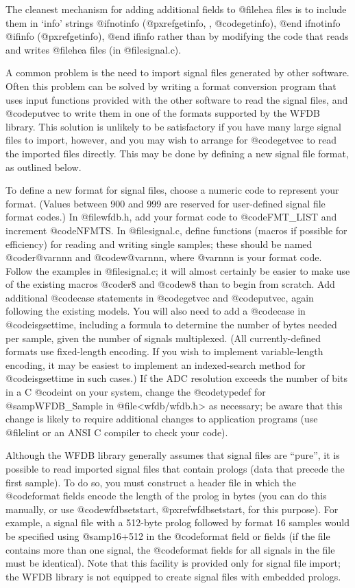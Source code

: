 {{{{{{{{The cleanest mechanism for adding additional fields to @file{hea} files is
to include them in `info' strings
@ifnotinfo
(@pxref{getinfo, , @code{getinfo}}),
@end ifnotinfo
@ifinfo
(@pxref{getinfo}),
@end ifinfo
rather than by modifying the code that reads and writes @file{hea}
files (in @file{signal.c}).

A common problem is the need to import signal files generated by other
software.  Often this problem can be solved by writing a format
conversion program that uses input functions provided with the other
software to read the signal files, and @code{putvec} to write them
in one of the formats supported by the WFDB library.  This solution is
unlikely to be satisfactory if you have many large signal files to
import, however, and you may wish to arrange for @code{getvec} to read
the imported files directly.  This may be done by defining a new signal
file format, as outlined below.

To define a new format for signal files, choose a numeric code to
represent your format.  (Values between 900 and 999 are reserved for
user-defined signal file format codes.)  In @file{wfdb.h}, add your format
code to @code{FMT_LIST} and increment @code{NFMTS}.  In @file{signal.c},
define functions (macros if possible for efficiency) for reading and
writing single samples; these should be named @code{r@var{nnn}} and
@code{w@var{nnn}}, where @var{nnn} is your format code.  Follow the
examples in @file{signal.c}; it will almost certainly be easier to make
use of the existing macros @code{r8} and @code{w8} than to begin from
scratch.  Add additional @code{case} statements in @code{getvec} and
@code{putvec}, again following the existing models.  You will also need
to add a @code{case} in @code{isgsettime}, including a formula to
determine the number of bytes needed per sample, given the number of
signals multiplexed.  (All currently-defined formats use fixed-length
encoding.  If you wish to implement variable-length encoding, it may be
easiest to implement an indexed-search method for @code{isgsettime} in
such cases.)  If the ADC resolution exceeds the number of bits in a C
@code{int} on your system, change the @code{typedef} for @samp{WFDB_Sample}
in @file{<wfdb/wfdb.h>} as necessary;  be aware that this change is likely
to require additional changes to application programs (use @file{lint}
or an ANSI C compiler to check your code).

Although the WFDB library generally assumes that signal files are ``pure'', it
is possible to read imported signal files that contain prologs (data that
precede the first sample).  To do so, you must construct a header file in which
the @code{format} fields encode the length of the prolog in bytes (you can do
this manually, or use @code{wfdbsetstart}, @pxref{wfdbsetstart}, for this
purpose).  For example, a signal file with a 512-byte prolog followed by format
16 samples would be specified using @samp{16+512} in the @code{format} field or
fields (if the file contains more than one signal, the @code{format} fields for
all signals in the file must be identical).  Note that this facility is
provided only for signal file import; the WFDB library is not equipped to
create signal files with embedded prologs.

}}}}}}}}
